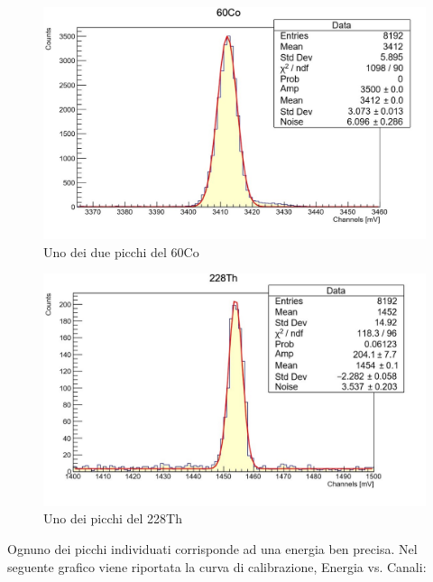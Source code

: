 \documentclass[a4paper,10pt]{article}
\begin{document}
\begin{figure}[H]
    \centering
    \includegraphics[scale=0.7]{grafici/piccoCo}
    \caption{Uno dei due picchi del 60Co}
\end{figure}

\begin{figure}[H]
    \centering
    \includegraphics[scale=0.7]{grafici/piccoTh}
    \caption{Uno dei picchi del 228Th}
\end{figure}

\noindent Ognuno dei picchi individuati corrisponde ad una energia ben precisa. Nel seguente grafico viene riportata la curva di calibrazione, Energia vs. Canali:
\end{document}
